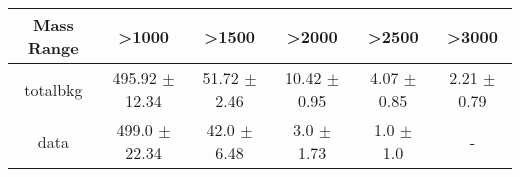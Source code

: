 \begin{footnotesize} 
\begin{tabular}{c|c|c|c|c|c} 
Mass Range & >1000 & >1500 & >2000 & >2500 & >3000 \\ 
\hline\hline 
totalbkg & 495.92 $\pm$ 12.34 & 51.72 $\pm$ 2.46 & 10.42 $\pm$ 0.95 & 4.07 $\pm$ 0.85 & 2.21 $\pm$ 0.79\\ 
data & 499.0 $\pm$ 22.34 & 42.0 $\pm$ 6.48 & 3.0 $\pm$ 1.73 & 1.0 $\pm$ 1.0 &  - \\ 
\hline\hline 
\end{tabular} 
\end{footnotesize} 
\newline 

